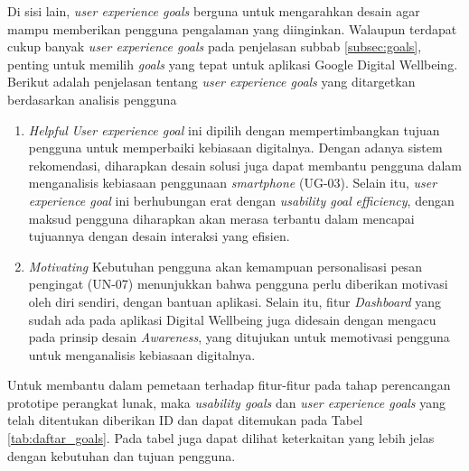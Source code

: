 Di sisi lain, \textit{user experience goals} berguna untuk mengarahkan desain agar mampu memberikan pengguna pengalaman yang diinginkan. Walaupun terdapat cukup banyak \textit{user experience goals} pada penjelasan subbab \ref{subsec:goals}, penting untuk memilih \textit{goals} yang tepat untuk aplikasi Google Digital Wellbeing. Berikut adalah penjelasan tentang \textit{user experience goals} yang ditargetkan berdasarkan analisis pengguna

\begin{enumerate}
  \item \textit{Helpful}
  \subitem \textit{User experience goal} ini dipilih dengan mempertimbangkan tujuan pengguna untuk memperbaiki kebiasaan digitalnya. Dengan adanya sistem rekomendasi, diharapkan desain solusi juga dapat membantu pengguna dalam menganalisis kebiasaan penggunaan \textit{smartphone} (UG-03). Selain itu, \textit{user experience goal} ini berhubungan erat dengan \textit{usability goal} \textit{efficiency}, dengan maksud pengguna diharapkan akan merasa terbantu dalam mencapai tujuannya dengan desain interaksi yang efisien.

  \item \textit{Motivating}
  \subitem Kebutuhan pengguna akan kemampuan personalisasi pesan pengingat (UN-07) menunjukkan bahwa pengguna perlu diberikan motivasi oleh diri sendiri, dengan bantuan aplikasi. Selain itu, fitur \textit{Dashboard} yang sudah ada pada aplikasi Digital Wellbeing juga didesain dengan mengacu pada prinsip desain \textit{Awareness}, yang ditujukan untuk memotivasi pengguna untuk menganalisis kebiasaan digitalnya.

\end{enumerate}

Untuk membantu dalam pemetaan terhadap fitur-fitur pada tahap perencangan prototipe perangkat lunak, maka \textit{usability goals} dan \textit{user experience goals} yang telah ditentukan diberikan ID dan dapat ditemukan pada Tabel \ref{tab:daftar_goals}. Pada tabel juga dapat dilihat keterkaitan yang lebih jelas dengan kebutuhan dan tujuan pengguna.

